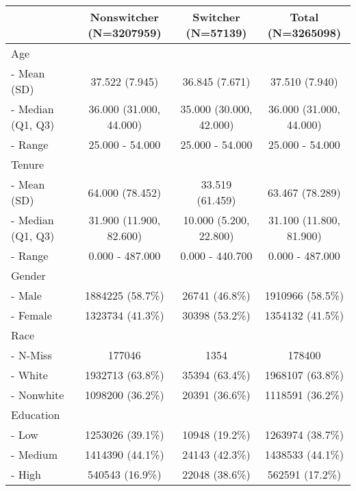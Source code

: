 \documentclass[]{article}
\title{}
\author{}
\date{}
\begin{document}
\begin{longtable}[c]{@{}lccc@{}}
\toprule
& Nonswitcher (N=3207959) & Switcher (N=57139) & Total
(N=3265098)\tabularnewline
\midrule
\endhead
Age & & &\tabularnewline
- Mean (SD) & 37.522 (7.945) & 36.845 (7.671) & 37.510
(7.940)\tabularnewline
- Median (Q1, Q3) & 36.000 (31.000, 44.000) & 35.000 (30.000, 42.000) &
36.000 (31.000, 44.000)\tabularnewline
- Range & 25.000 - 54.000 & 25.000 - 54.000 & 25.000 -
54.000\tabularnewline
Tenure & & &\tabularnewline
- Mean (SD) & 64.000 (78.452) & 33.519 (61.459) & 63.467
(78.289)\tabularnewline
- Median (Q1, Q3) & 31.900 (11.900, 82.600) & 10.000 (5.200, 22.800) &
31.100 (11.800, 81.900)\tabularnewline
- Range & 0.000 - 487.000 & 0.000 - 440.700 & 0.000 -
487.000\tabularnewline
Gender & & &\tabularnewline
- Male & 1884225 (58.7\%) & 26741 (46.8\%) & 1910966
(58.5\%)\tabularnewline
- Female & 1323734 (41.3\%) & 30398 (53.2\%) & 1354132
(41.5\%)\tabularnewline
Race & & &\tabularnewline
- N-Miss & 177046 & 1354 & 178400\tabularnewline
- White & 1932713 (63.8\%) & 35394 (63.4\%) & 1968107
(63.8\%)\tabularnewline
- Nonwhite & 1098200 (36.2\%) & 20391 (36.6\%) & 1118591
(36.2\%)\tabularnewline
Education & & &\tabularnewline
- Low & 1253026 (39.1\%) & 10948 (19.2\%) & 1263974
(38.7\%)\tabularnewline
- Medium & 1414390 (44.1\%) & 24143 (42.3\%) & 1438533
(44.1\%)\tabularnewline
- High & 540543 (16.9\%) & 22048 (38.6\%) & 562591
(17.2\%)\tabularnewline
\bottomrule
\end{longtable}
\end{document}
